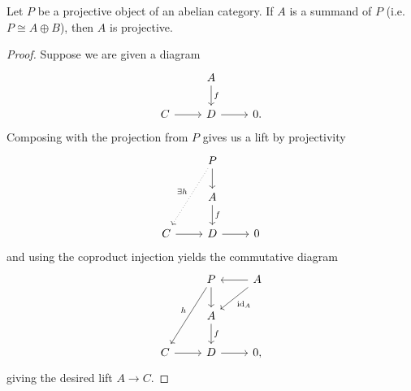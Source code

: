 \documentclass[10pt]{amsart}
\begin{document}
\begin{lem}\label{lem10}
  Let $P$ be a projective object of an abelian category.
  If $A$ is a summand of $P$ (i.e. $P \cong A \oplus B$), then $A$ is projective.
  \begin{proof}
    Suppose we are given a diagram
    $$\begin{tikzcd}
      & A \arrow{d}{f} &\\
      C \arrow{r} & D \arrow{r} & 0.
    \end{tikzcd}$$
    Composing with the projection from $P$ gives us a lift by projectivity
    $$\begin{tikzcd}
      & P\arrow{d}\arrow[dotted,swap]{ddl}{\exists h} & \\
      & A \arrow{d}{f} &\\
      C \arrow{r} & D \arrow{r} & 0
    \end{tikzcd}$$
    and using the coproduct injection yields the commutative diagram
    $$\begin{tikzcd}
      & P \arrow{d}\arrow[swap]{ddl}{h} & A \arrow{l} \arrow{ld}{\operatorname{id}_A}\\
      & A \arrow{d}{f} &\\
      C \arrow{r} & D \arrow{r} & 0,
    \end{tikzcd}$$
    giving the desired lift $A \rightarrow C$.
  \end{proof}
\end{lem}
\end{document}
